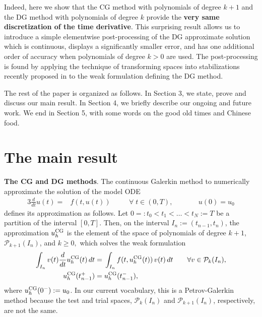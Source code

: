 \documentclass[bpam,reqno]{ipart}
\begin{document}
Indeed, here we show that the CG method with polynomials of degree $k+1$ and the DG method with polynomials of degree $k$ provide the {\bf very same discretization of the time derivative}. 
This surprising result allows us to introduce a
 simple elementwise post-processing of the DG approximate solution
 which is continuous, displays a significantly smaller error, and has  one additional order of accuracy when polynomials of degree $k>0$ are used. The post-processing is found by applying the technique of  transforming spaces into stabilizations recently proposed in \cite{Cockburn23} to the weak formulation defining the DG method.

The rest of the paper is organized as follows. In Section 3, we state, prove and discuss our main result.  In Section 4, we briefly  describe our ongoing and future work. We end in Section 5, with some words on the good old times and Chinese food.


  
\section{The main result}

{\bf The CG and DG methods}. The continuous Galerkin \cite{HulmeI72,HulmeII72} method to numerically approximate the solution of the model ODE
\begin{alignat*}{3}
\frac{d}{dt} u(t) =& f(t,u(t)) &&\quad  \forall \; t\in (0,T),
&&\qquad
u(0)=u_0
\end{alignat*}
defines its approximation as follows. { Let $0=:t_0<t_1<\dots<t_N:=T$ be a partition of the interval $[0,T]$. Then,
on} the interval $I_n:=(t_{n-1},t_n)$, the approximation $u^{{\rm CG}}_h$ is the element of the space of polynomials of degree {$k+1$, $\mathcal{P}_{k+1}(I_n)$, and $k\ge 0,$} which solves the weak formulation
\begin{alignat*}{2}
\int_{I_n}  v(t)\frac{d}{dt} u^{{\rm CG}}_h (t) \,dt =&\;
\int_{I_n}  f(t,u^{{\rm CG}}_h(t)) \,v(t)\,dt &&\quad\forall v\in \mathcal{P}_k(I_n),
\\
u^{{\rm CG}}_h(t_{n-1}^+)=&\;u^{{\rm CG}}_h(t_{n-1}^-),
\end{alignat*}
where $u^{{\rm CG}}_h(0^-):=u_0$. In our current vocabulary, this is a Petrov-Galerkin method because the test and trial spaces, $\mathcal{P}_k(I_n)$ and $\mathcal{P}_{k+1}(I_n)$, respectively, are not the same.
\end{document}
